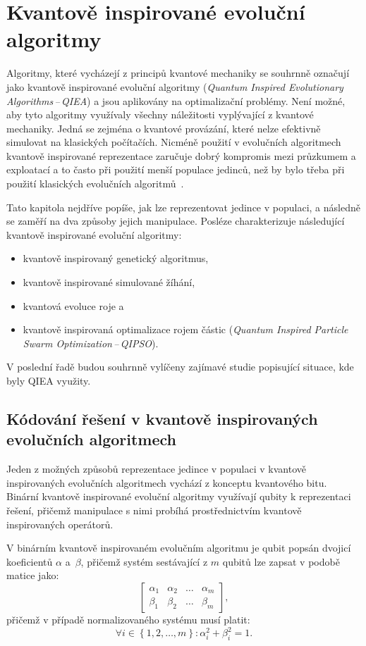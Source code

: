\chapter{Kvantově inspirované evoluční algoritmy} \label{chapt:qiea}
Algoritmy, které vycházejí z principů kvantové mechaniky se souhrnně označují jako kvantově inspirované evoluční algoritmy (\emph{Quantum Inspired Evolutionary Algorithms\,--\,QIEA}) a jsou aplikovány na optimalizační problémy. 
Není možné, aby tyto algoritmy využívaly všechny náležitosti vyplývající z kvantové mechaniky. 
Jedná se zejména o kvantové provázání, které nelze efektivně simulovat na klasických počítačích. 
Nicméně použití v evolučních algoritmech kvantově inspirované reprezentace zaručuje dobrý kompromis mezi průzkumem a exploatací a to často při použití menší populace jedinců, než by bylo třeba při použití klasických evolučních algoritmů~\cite{NaturalComputing}.

Tato kapitola nejdříve popíše, jak lze reprezentovat jedince v populaci, a následně se zaměří na dva způsoby jejich manipulace. 
Posléze charakterizuje následující kvantově inspirované evoluční algoritmy:
\begin{itemize}
    \item kvantově inspirovaný genetický algoritmus,
    \item kvantově inspirované simulované žíhání,
    \item kvantová evoluce roje a
    \item kvantově inspirovaná optimalizace rojem částic (\emph{Quantum Inspired Particle Swarm Optimization\,--\,QIPSO}).
\end{itemize}
V poslední řadě budou souhrnně vylíčeny zajímavé studie popisující situace, kde byly QIEA využity. 

\section{Kódování řešení v kvantově inspirovaných evolučních algoritmech}
Jeden z možných způsobů reprezentace jedince v populaci v kvantově inspirovaných evolučních algoritmech vychází z konceptu kvantového bitu. 
Binární kvantově inspirované evoluční algoritmy využívají qubity k reprezentaci řešení, přičemž manipulace s nimi probíhá prostřednictvím kvantově inspirovaných operátorů.

V binárním kvantově inspirovaném evolučním algoritmu je qubit popsán dvojicí koeficientů $\alpha$ a~$\beta$, přičemž systém sestávající z $m$ qubitů lze zapsat v podobě matice jako: 
\begin{equation}\label{eq:quantum-representation}
    \begin{bmatrix}
        \alpha_1 & \alpha_2 & \dots & \alpha_m \\
        \beta_1  & \beta_2  & \dots & \beta_m
    \end{bmatrix},
\end{equation}
přičemž v případě normalizovaného systému musí platit:
\begin{equation}\label{eq:normalized-quantum-representation}
    \forall i \in \left\{1,2,\dots,m \right\}: \alpha^2_i + \beta^2_i = 1.
\end{equation}

